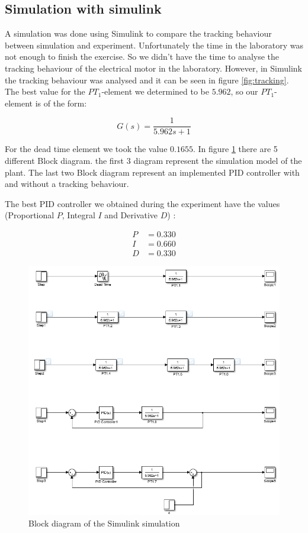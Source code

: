 \subsection{Simulation with simulink}

A simulation was done using Simulink to compare the tracking behaviour between
simulation and experiment. Unfortunately  the  time  in the laboratory was not
enough  to finish the exercise. So we didn't have  the  time  to  analyse  the
tracking behaviour of the electrical motor  in  the  laboratory.  However,  in
Simulink  the  tracking  behaviour was analysed and it can be seen  in  figure
\ref{fig:tracking}. The best value for  the  $PT_{1}$-element we determined to
be $5.962$, so our $PT_{1}$-element is of the form:

\begin{equation}
    G(s) = \frac{1}{5.962s+1}
\end{equation}

For  the   dead   time   element   we  took  the  value  $0.1655$.  In  figure
\ref{fig:simulink} there are 5  different  Block  diagram. the first 3 diagram
represent  the  simulation  model  of  the  plant. The last two Block  diagram
represent an implemented PID controller with and without a tracking behaviour.

The best PID controller we obtained  during  the  experiment  have  the values
(Proportional $P$, Integral $I$ and Derivative $D$) :

\begin{align*}
    P &= 0.330 \\
    I &= 0.660 \\
    D &= 0.330
\end{align*}

\begin{figure}[t]
    \centering
    \includegraphics[width=\imagewidth]{images/simulink.png}
    \caption{Block diagram of the Simulink simulation}
    \label{fig:simulink}
\end{figure}

